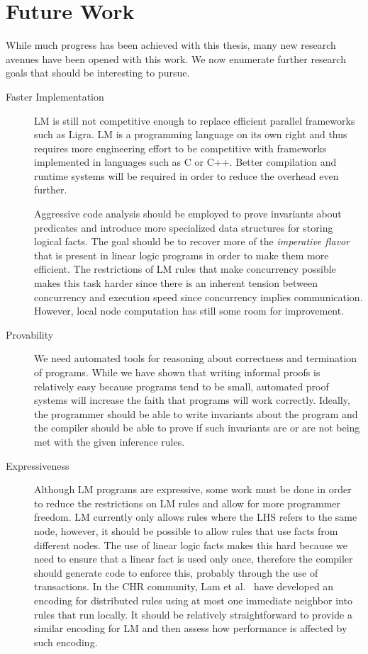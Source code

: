 \section{Future Work}

While much progress has been achieved with this thesis, many new research
avenues have been opened with this work. We now enumerate further research goals
that should be interesting to pursue.

\begin{description}
   \item[Faster Implementation]

LM is still not competitive enough to replace efficient parallel frameworks such
as Ligra. LM is a programming language on its own right and thus requires more
engineering effort to be competitive with frameworks implemented in languages
such as C or C++. Better compilation and runtime systems will be required in
order to reduce the overhead even further.

Aggressive code analysis should be employed to prove invariants about predicates
and introduce more specialized data structures for storing logical facts. The
goal should be to recover more of the \emph{imperative flavor} that is present
in linear logic programs in order to make them more efficient. The restrictions
of LM rules that make concurrency possible makes this task harder since there is
an inherent tension between concurrency and execution speed since concurrency
implies communication. However, local node computation has still some room for
improvement.

\item[Provability]

We need automated tools for reasoning about correctness and termination of
programs. While we have shown that writing informal proofs is relatively easy
because programs tend to be small, automated proof systems will increase the
faith that programs will work correctly. Ideally, the programmer should be able
to write invariants about the program and the compiler should be able to prove
if such invariants are or are not being met with the given inference rules.

\item[Expressiveness]

Although LM programs are expressive, some work must be done in order to reduce
the restrictions on LM rules and allow for more programmer freedom.  LM
currently only allows rules where the LHS refers to the same node, however, it
should be possible to allow rules that use facts from different nodes. The use
of linear logic facts makes this hard because we need to ensure that a linear
fact is used only once, therefore the compiler should generate code to enforce
this, probably through the use of transactions. In the CHR community, Lam et
al.~\cite{Lam:2013:DEC:2505879.2505892} have developed an encoding for
distributed rules using at most one immediate neighbor into rules that run
locally. It should be relatively straightforward to provide a similar encoding
for LM and then assess how performance is affected by such encoding.


\end{description}
